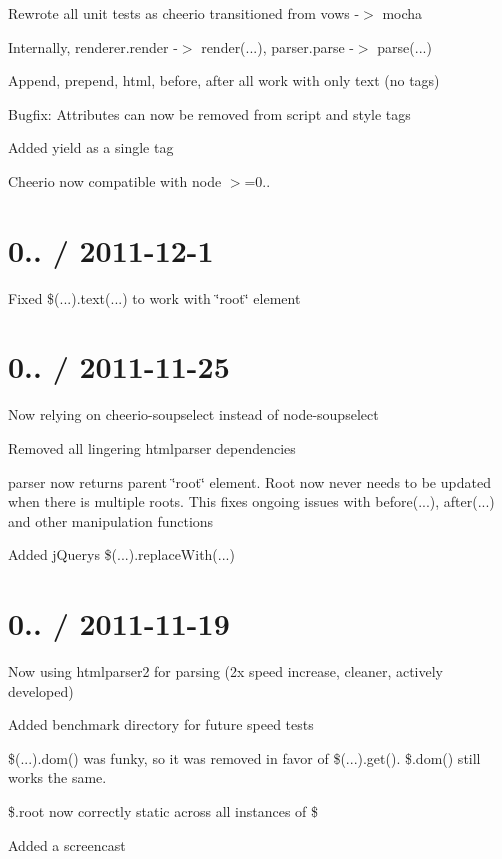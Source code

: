 \begin{DoxyItemize}
\item Rewrote all unit tests as cheerio transitioned from vows -\/$>$ mocha
\item Internally, renderer.\+render -\/$>$ render(...), parser.\+parse -\/$>$ parse(...)
\item Append, prepend, html, before, after all work with only text (no tags)
\item Bugfix\+: Attributes can now be removed from script and style tags
\item Added yield as a single tag
\item Cheerio now compatible with node $>$=0..
\end{DoxyItemize}

\section*{0.. / 2011-\/12-\/1 }


\begin{DoxyItemize}
\item Fixed \$(...).text(...) to work with \char`\"{}root\char`\"{} element
\end{DoxyItemize}

\section*{0.. / 2011-\/11-\/25 }


\begin{DoxyItemize}
\item Now relying on cheerio-\/soupselect instead of node-\/soupselect
\item Removed all lingering htmlparser dependencies
\item parser now returns parent \char`\"{}root\char`\"{} element. Root now never needs to be updated when there is multiple roots. This fixes ongoing issues with before(...), after(...) and other manipulation functions
\item Added j\+Query\textquotesingle{}s \$(...).replace\+With(...)
\end{DoxyItemize}

\section*{0.. / 2011-\/11-\/19 }


\begin{DoxyItemize}
\item Now using htmlparser2 for parsing (2x speed increase, cleaner, actively developed)
\item Added benchmark directory for future speed tests
\item \$(\textquotesingle{}...\textquotesingle{}).dom() was funky, so it was removed in favor of \$(\textquotesingle{}...\textquotesingle{}).get(). \$.dom() still works the same.
\item \$.root now correctly static across all instances of \$
\item Added a screencast
\end{DoxyItemize}


